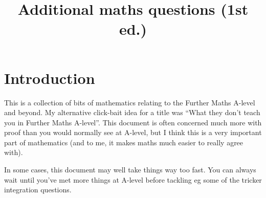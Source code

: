 \documentclass[fleqn,a4paper,11pt]{article}
\date{}
\author{}
\title{Additional maths questions (1st ed.)}
\begin{document}
\maketitle
\tableofcontents

\section{Introduction}

This is a collection of bits of mathematics relating to the Further Maths
A-level and beyond. My alternative click-bait idea for a title was ``What they
don't teach you in Further Maths A-level''. This document is often concerned
much more with proof than you would normally see at A-level, but I think this is
a very important part of mathematics (and to me, it makes maths much easier to
really agree with).

In some cases, this document may well take things way too fast. You can always
wait until you've met more things at A-level before tackling eg some of the
tricker integration questions.









\end{document}
